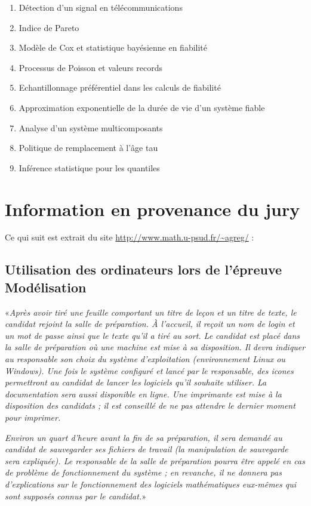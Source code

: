 {{\begin{enumerate}
\item \label{T-624} Détection d'un signal en télécommunications
\item \label{T-625} Indice de Pareto
\item \label{T-626} Modèle de Cox et statistique bayésienne en fiabilité
\item \label{T-627} Processus de Poisson et valeurs records
\item \label{T-628} Echantillonnage préférentiel dans les calculs de fiabilité
\item \label{T-629} Approximation exponentielle de la durée de vie d'un système fiable
\item \label{T-630} Analyse d'un système multicomposants
\item \label{T-631} Politique de remplacement à l'âge tau
\item \label{T-632} Inférence statistique pour les quantiles
\end{enumerate}

%
\section{Information en provenance du jury}
%

Ce qui suit est extrait du site \url{http://www.math.u-psud.fr/~agreg/} :

\subsection{Utilisation des ordinateurs lors de l'épreuve Modélisation}

«\emph{Après avoir tiré une feuille comportant un titre de leçon et un titre
  de texte, le candidat rejoint la salle de préparation. À l'accueil, il
  reçoit un nom de login et un mot de passe ainsi que le texte qu'il a tiré au
  sort. Le candidat est placé dans la salle de préparation où une machine est
  mise à sa disposition. Il devra indiquer au responsable son choix du système
  d'exploitation (environnement Linux ou Windows). Une fois le système
  configuré et lancé par le responsable, des icones permettront au candidat de
  lancer les logiciels qu'il souhaite utiliser. La documentation sera aussi
  disponible en ligne.  Une imprimante est mise à la disposition des candidats
  ; il est conseillé de ne pas attendre le dernier moment pour imprimer.}

\emph{Environ un quart d'heure avant la fin de sa préparation, il sera demandé
  au candidat de sauvegarder ses fichiers de travail (la manipulation de
  sauvegarde sera expliquée). Le responsable de la salle de préparation pourra
  être appelé en cas de problème de fonctionnement du système ; en revanche,
  il ne donnera pas d'explications sur le fonctionnement des logiciels
  mathématiques eux-mêmes qui sont supposés connus par le candidat.}»

}}
